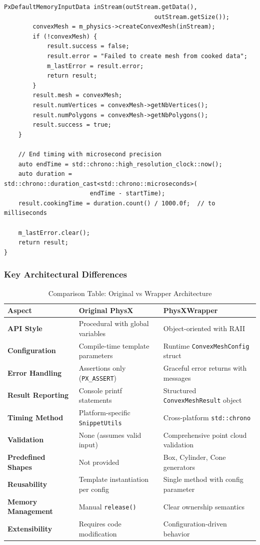 \begin{lstlisting}[caption={Wrapper: Runtime-configured cooking with result struct}]
        PxDefaultMemoryInputData inStream(outStream.getData(),
                                          outStream.getSize());
        convexMesh = m_physics->createConvexMesh(inStream);
        if (!convexMesh) {
            result.success = false;
            result.error = "Failed to create mesh from cooked data";
            m_lastError = result.error;
            return result;
        }
        result.mesh = convexMesh;
        result.numVertices = convexMesh->getNbVertices();
        result.numPolygons = convexMesh->getNbPolygons();
        result.success = true;
    }

    // End timing with microsecond precision
    auto endTime = std::chrono::high_resolution_clock::now();
    auto duration = std::chrono::duration_cast<std::chrono::microseconds>(
                        endTime - startTime);
    result.cookingTime = duration.count() / 1000.0f;  // to milliseconds

    m_lastError.clear();
    return result;
}
\end{lstlisting}

\subsubsection{Key Architectural Differences}

\begin{table}[h]
\centering
\small
\begin{tabular}{|p{4cm}|p{5cm}|p{5cm}|}
\hline
\textbf{Aspect} & \textbf{Original PhysX} & \textbf{PhysXWrapper} \\
\hline
\textbf{API Style} & Procedural with global variables & Object-oriented with RAII \\
\hline
\textbf{Configuration} & Compile-time template parameters & Runtime \texttt{ConvexMeshConfig} struct \\
\hline
\textbf{Error Handling} & Assertions only (\texttt{PX\_ASSERT}) & Graceful error returns with messages \\
\hline
\textbf{Result Reporting} & Console printf statements & Structured \texttt{ConvexMeshResult} object \\
\hline
\textbf{Timing Method} & Platform-specific \texttt{SnippetUtils} & Cross-platform \texttt{std::chrono} \\
\hline
\textbf{Validation} & None (assumes valid input) & Comprehensive point cloud validation \\
\hline
\textbf{Predefined Shapes} & Not provided & Box, Cylinder, Cone generators \\
\hline
\textbf{Reusability} & Template instantiation per config & Single method with config parameter \\
\hline
\textbf{Memory Management} & Manual \texttt{release()} & Clear ownership semantics \\
\hline
\textbf{Extensibility} & Requires code modification & Configuration-driven behavior \\
\hline
\end{tabular}
\caption{Comparison Table: Original vs Wrapper Architecture}
\end{table}

